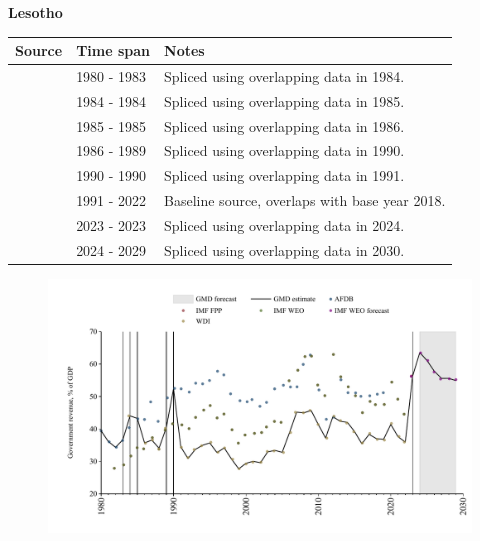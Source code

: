 \documentclass[12pt,a4paper,landscape]{article}
\begin{document}
\begin{adjustbox}{max totalsize={\paperwidth}{\paperheight},center}
\begin{minipage}[t][\textheight][t]{\textwidth}
\vspace*{0.5cm}
{}
\begin{center}
{\Large\bfseries Lesotho}
\end{center}
\vspace{0.5cm}
\begin{table}[H]
\centering
\small
\begin{tabular}{|l|l|l|}
\hline
\textbf{Source} & \textbf{Time span} & \textbf{Notes} \\
\hline
\rowcolor{white}\cite{AFDB}& 1980 - 1983 &Spliced using overlapping data in 1984.\\
\rowcolor{lightgray}\cite{WDI}& 1984 - 1984 &Spliced using overlapping data in 1985.\\
\rowcolor{white}\cite{AFDB}& 1985 - 1985 &Spliced using overlapping data in 1986.\\
\rowcolor{lightgray}\cite{WDI}& 1986 - 1989 &Spliced using overlapping data in 1990.\\
\rowcolor{white}\cite{AFDB}& 1990 - 1990 &Spliced using overlapping data in 1991.\\
\rowcolor{lightgray}\cite{WDI}& 1991 - 2022 &Baseline source, overlaps with base year 2018.\\
\rowcolor{white}\cite{IMF_FPP}& 2023 - 2023 &Spliced using overlapping data in 2024.\\
\rowcolor{lightgray}\cite{IMF_WEO_forecast}& 2024 - 2029 &Spliced using overlapping data in 2030.\\
\hline
\end{tabular}
\end{table}
\begin{figure}[H]
\centering
\includegraphics[width=\textwidth,height=0.6\textheight,keepaspectratio]{graphs/LSO_govrev_GDP.pdf}
\end{figure}
\end{minipage}
\end{adjustbox}
\end{document}
